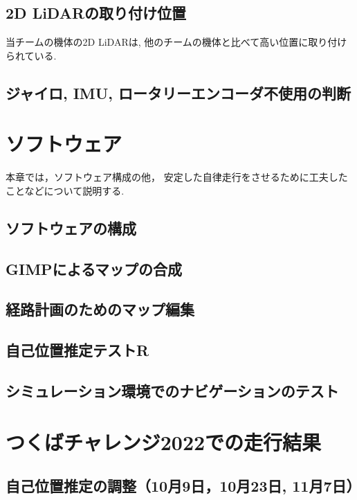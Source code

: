 \documentclass[twocolumn,9pt]{jsproceedings}
\begin{document}
\subsection{2D LiDARの取り付け位置}

当チームの機体の2D LiDARは, 他のチームの機体と比べて高い位置に取り付けられている.
\cite{RTshop}

\subsection{ジャイロ, IMU, ロータリーエンコーダ不使用の判断}

\section{ソフトウェア}

本章では，ソフトウェア構成の他，
安定した自律走行をさせるために工夫したことなどについて説明する.


\subsection{ソフトウェアの構成}

\subsection{GIMPによるマップの合成}

\subsection{経路計画のためのマップ編集}


\subsection{自己位置推定テストR}

\subsection{シミュレーション環境でのナビゲーションのテスト}

\section{つくばチャレンジ2022での走行結果}

\subsection{自己位置推定の調整（10月9日，10月23日, 11月7日）}
\end{document}
